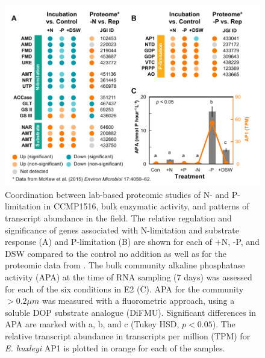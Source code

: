\begin{figure}[h!]
  \centering
    \includegraphics[width=1\textwidth]{Images/C5_Figure5_McKewComparison_v2.pdf}
    \caption[Coordination between lab-based proteomic studies of N- and P-limitation in CCMP1516, bulk enzymatic activity, and patterns of transcript abundance in the field]{Coordination between lab-based proteomic studies of N- and P-limitation in CCMP1516, bulk enzymatic activity, and patterns of transcript abundance in the field. The relative regulation and significance of genes associated with N-limitation and substrate response (A) and P-limitation (B) are shown for each of +N, -P, and DSW compared to the control no addition as well as for the proteomic data from \citet{McKew2015}.  The bulk community alkaline phosphatase activity (APA) at the time of RNA sampling (7 days) was assessed for each of the six conditions in E2 (C). APA for the community $> 0.2 \mu m$ was measured with a fluorometric approach, using a soluble DOP substrate analogue (DiFMU). Significant differences in APA are marked with a, b, and c (Tukey HSD, $p < 0.05$). The relative transcript abundance in transcripts per million (TPM) for \textit{E. huxleyi} AP1 is plotted in orange for each of the samples. }
  \label{fig:c5f5}
\end{figure}

